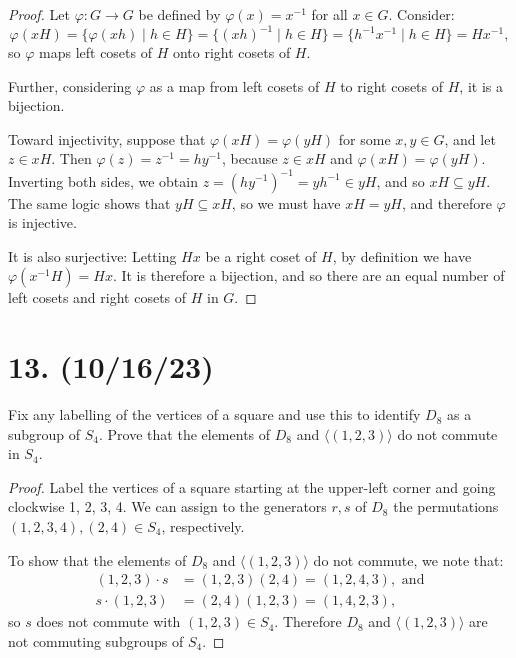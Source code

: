 \documentclass{article}
\begin{document}
\begin{proof}
    Let $\varphi: G \rightarrow G$ be defined by $\varphi(x) = x^{-1}$ for all $x \in G$. Consider:
    \begin{equation*}
        \varphi(xH) = \{ \varphi(xh) \mid h \in H \} = \{ (xh)^{-1} \mid h \in H \} = \{ h^{-1} x^{-1} \mid h \in H \} = Hx^{-1},
    \end{equation*}
    so $\varphi$ maps left cosets of $H$ onto right cosets of $H$.

    Further, considering $\varphi$ as a map from left cosets of $H$ to right cosets of $H$, it is a bijection.
    
    Toward injectivity, suppose that $\varphi(xH) = \varphi(yH)$ for some $x, y \in G$, and let $z \in xH$. Then $\varphi(z) = z^{-1} = hy^{-1}$, because $z \in xH$ and $\varphi(xH) = \varphi(yH)$. Inverting both sides, we obtain $z = (hy^{-1})^{-1} = yh^{-1} \in yH$, and so $xH \subseteq yH$. The same logic shows that $yH \subseteq xH$, so we must have $xH = yH$, and therefore $\varphi$ is injective.

    It is also surjective: Letting $Hx$ be a right coset of $H$, by definition we have $\varphi(x^{-1}H) = Hx$. It is therefore a bijection, and so there are an equal number of left cosets and right cosets of $H$ in $G$. 
\end{proof}

\section*{13. (10/16/23)}

Fix any labelling of the vertices of a square and use this to identify $D_8$ as a subgroup of $S_4$. Prove that the elements of $D_8$ and $\langle (1, 2, 3) \rangle$ do not commute in $S_4$.

\begin{proof}
    Label the vertices of a square starting at the upper-left corner and going clockwise 1, 2, 3, 4. We can assign to the generators $r, s$ of $D_8$ the permutations $(1, 2, 3, 4), (2, 4) \in S_4$, respectively.

    To show that the elements of $D_8$ and $\langle (1, 2, 3) \rangle$ do not commute, we note that:
    \begin{align*}
        (1, 2, 3) \cdot s &= (1, 2, 3)(2, 4) = (1, 2, 4, 3), \text{ and} \\
        s \cdot (1, 2, 3) &= (2, 4)(1, 2, 3) = (1, 4, 2, 3),
    \end{align*}
    so $s$ does not commute with $(1, 2, 3) \in S_4$. Therefore $D_8$ and $\langle (1, 2, 3) \rangle$ are not commuting subgroups of $S_4$.
\end{proof}
\end{document}
